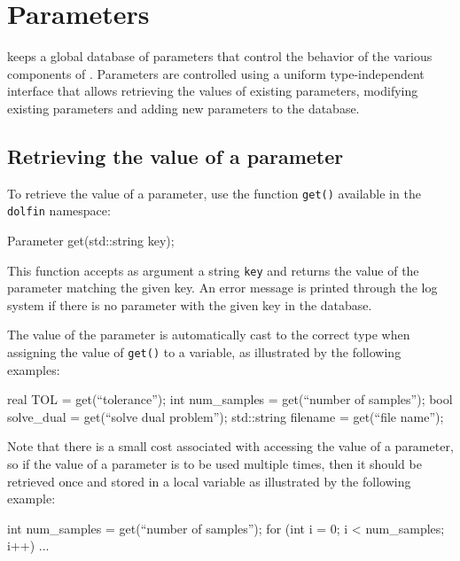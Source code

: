 \chapter{Parameters}
\label{sec:parameters}


\dolfin{} keeps a global database of parameters that control the
behavior of the various components of \dolfin{}. Parameters are
controlled using a uniform type-independent interface that allows
retrieving the values of existing parameters, modifying existing
parameters and adding new parameters to the database.

\section{Retrieving the value of a parameter}

To retrieve the value of a parameter, use the function \texttt{get()}
available in the \texttt{dolfin} namespace:
\begin{code}
Parameter get(std::string key);
\end{code}
This function accepts as argument a string \texttt{key} and returns
the value of the parameter matching the given key. An error message is
printed through the log system if there is no parameter with the given
key in the database.

The value of the parameter is automatically cast to the correct type
when assigning the value of \texttt{get()} to a variable, as
illustrated by the following examples:
\begin{code}
real TOL = get(``tolerance'');
int num_samples = get(``number of samples'');
bool solve_dual = get(``solve dual problem'');
std::string filename = get(``file name'');
\end{code}

Note that there is a small cost associated with accessing the value of
a parameter, so if the value of a parameter is to be used multiple
times, then it should be retrieved once and stored in a local variable
as illustrated by the following example:
\begin{code}
int num_samples = get(``number of samples'');
for (int i = 0; i < num_samples; i++)
{
  ...
}
\end{code}

